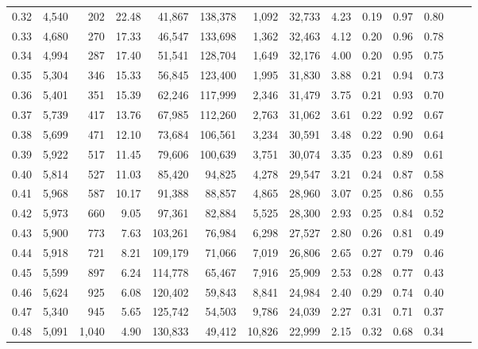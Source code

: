 \begin{tabular}{rrrrrrrrrrrrrr}
0.32 &  4,540 &    202 &   22.48 &   41,867 &  138,378 &   1,092 &  32,733 &  4.23 &  0.19 &  0.97 &      0.80 \\
0.33 &  4,680 &    270 &   17.33 &   46,547 &  133,698 &   1,362 &  32,463 &  4.12 &  0.20 &  0.96 &      0.78 \\
0.34 &  4,994 &    287 &   17.40 &   51,541 &  128,704 &   1,649 &  32,176 &  4.00 &  0.20 &  0.95 &      0.75 \\
0.35 &  5,304 &    346 &   15.33 &   56,845 &  123,400 &   1,995 &  31,830 &  3.88 &  0.21 &  0.94 &      0.73 \\
0.36 &  5,401 &    351 &   15.39 &   62,246 &  117,999 &   2,346 &  31,479 &  3.75 &  0.21 &  0.93 &      0.70 \\
0.37 &  5,739 &    417 &   13.76 &   67,985 &  112,260 &   2,763 &  31,062 &  3.61 &  0.22 &  0.92 &      0.67 \\
0.38 &  5,699 &    471 &   12.10 &   73,684 &  106,561 &   3,234 &  30,591 &  3.48 &  0.22 &  0.90 &      0.64 \\
0.39 &  5,922 &    517 &   11.45 &   79,606 &  100,639 &   3,751 &  30,074 &  3.35 &  0.23 &  0.89 &      0.61 \\
0.40 &  5,814 &    527 &   11.03 &   85,420 &   94,825 &   4,278 &  29,547 &  3.21 &  0.24 &  0.87 &      0.58 \\
0.41 &  5,968 &    587 &   10.17 &   91,388 &   88,857 &   4,865 &  28,960 &  3.07 &  0.25 &  0.86 &      0.55 \\
0.42 &  5,973 &    660 &    9.05 &   97,361 &   82,884 &   5,525 &  28,300 &  2.93 &  0.25 &  0.84 &      0.52 \\
0.43 &  5,900 &    773 &    7.63 &  103,261 &   76,984 &   6,298 &  27,527 &  2.80 &  0.26 &  0.81 &      0.49 \\
0.44 &  5,918 &    721 &    8.21 &  109,179 &   71,066 &   7,019 &  26,806 &  2.65 &  0.27 &  0.79 &      0.46 \\
0.45 &  5,599 &    897 &    6.24 &  114,778 &   65,467 &   7,916 &  25,909 &  2.53 &  0.28 &  0.77 &      0.43 \\
0.46 &  5,624 &    925 &    6.08 &  120,402 &   59,843 &   8,841 &  24,984 &  2.40 &  0.29 &  0.74 &      0.40 \\
0.47 &  5,340 &    945 &    5.65 &  125,742 &   54,503 &   9,786 &  24,039 &  2.27 &  0.31 &  0.71 &      0.37 \\
0.48 &  5,091 &  1,040 &    4.90 &  130,833 &   49,412 &  10,826 &  22,999 &  2.15 &  0.32 &  0.68 &      0.34 \\

\end{tabular}
